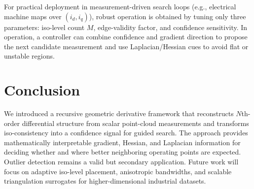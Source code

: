 ﻿\documentclass[conference]{IEEEtran}
\begin{document}
For practical deployment in measurement-driven search loops (e.g., electrical machine maps over $(i_d,i_q)$), robust operation is obtained by tuning only three parameters: iso-level count $M$, edge-validity factor, and confidence sensitivity. In operation, a controller can combine confidence and gradient direction to propose the next candidate measurement and use Laplacian/Hessian cues to avoid flat or unstable regions.

\section{Conclusion}
We introduced a recursive geometric derivative framework that reconstructs $N$th-order differential structure from scalar point-cloud measurements and transforms iso-consistency into a confidence signal for guided search. The approach provides mathematically interpretable gradient, Hessian, and Laplacian information for deciding whether and where better neighboring operating points are expected. Outlier detection remains a valid but secondary application. Future work will focus on adaptive iso-level placement, anisotropic bandwidths, and scalable triangulation surrogates for higher-dimensional industrial datasets.



\end{document}
